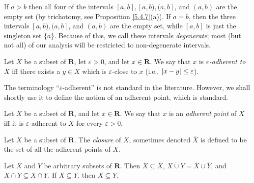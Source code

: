 \begin{example}\label{9.1.4}
    If \(a > b\) then all four of the intervals \([a, b], [a, b), (a, b]\), and \((a, b)\) are the empty set (by trichotomy, see Proposition \ref{5.4.7}(a)).
    If \(a = b\), then the three intervals \([a, b), (a, b]\), and \((a, b)\) are the empty set, while \([a, b]\) is just the singleton set \(\{a\}\).
    Because of this, we call these intervals \emph{degenerate};
    most (but not all) of our analysis will be restricted to non-degenerate intervals.
\end{example}

\begin{definition}\label{9.1.5}
    Let \(X\) be a subset of \(\mathbf{R}\), let \(\varepsilon > 0\), and let \(x \in \mathbf{R}\).
    We say that \(x\) is \emph{\(\varepsilon\)-adherent to \(X\)} iff there exists a \(y \in X\) which is \(\varepsilon\)-close to \(x\)
    (i.e., \(\abs*{x - y} \leq \varepsilon\)).
\end{definition}

\begin{remark}\label{9.1.6}
    The terminology ``\(\varepsilon\)-adherent'' is not standard in the literature.
    However, we shall shortly use it to define the notion of an adherent point, which is standard.
\end{remark}

\setcounter{theorem}{7}
\begin{definition}\label{9.1.8}
    Let \(X\) be a subset of \(\mathbf{R}\), and let \(x \in \mathbf{R}\).
    We say that \(x\) is an \emph{adherent point} of \(X\) iff it is \(\varepsilon\)-adherent to \(X\) for every \(\varepsilon > 0\).
\end{definition}

\setcounter{theorem}{9}
\begin{definition}[Closure]\label{9.1.10}
    Let \(X\) be a subset of \(\mathbf{R}\).
    The \emph{closure} of \(X\), sometimes denoted \(\overline{X}\) is defined to be the set of all the adherent points of \(X\).
\end{definition}

\begin{lemma}\label{9.1.11}
    Let \(X\) and \(Y\) be arbitrary subsets of \(\mathbf{R}\).
    Then \(X \subseteq \overline{X}\), \(\overline{X \cup Y} = \overline{X} \cup \overline{Y}\), and \(\overline{X \cap Y} \subseteq \overline{X} \cap \overline{Y}\).
    If \(X \subseteq Y\), then \(\overline{X} \subseteq \overline{Y}\).
\end{lemma}

